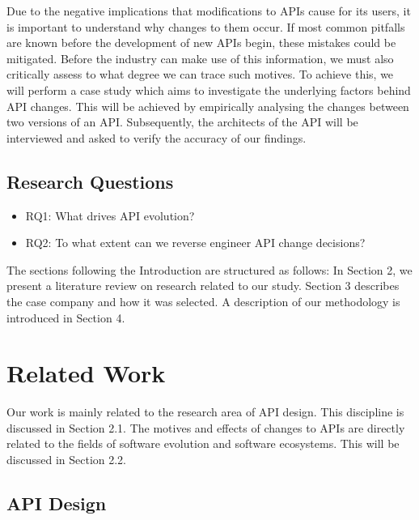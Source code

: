\documentclass[10pt,twocolumn]{article}
\begin{document}
Due to the negative implications that modifications to APIs cause for its users, it is important to understand why changes to them occur. If most common pitfalls are known before the development of new APIs begin, these mistakes could be mitigated. Before the industry can make use of this information, we must also critically assess to what degree we can trace such motives. To achieve this, we will perform a case study which aims to investigate the underlying factors behind API changes. This will be achieved by empirically analysing the changes between two versions of an API. Subsequently, the architects of the API will be interviewed and asked to verify the accuracy of our findings. 



\subsection{Research Questions}
\begin{itemize}
\item RQ1: What drives API evolution? 
\item RQ2: To what extent can we reverse engineer API change decisions?
\end{itemize}

The sections following the Introduction are structured as follows: In Section 2, we present a literature review on research related to our study. Section 3 describes the case company and how it was selected. A description of our methodology is introduced in Section 4. 

\section{Related Work}
Our work is mainly related to the research area of API design. This discipline is discussed in Section 2.1. The motives and effects of changes to APIs are directly related to the fields of software evolution and software ecosystems. This will be discussed in Section 2.2. 

\subsection{API Design}
\end{document}
